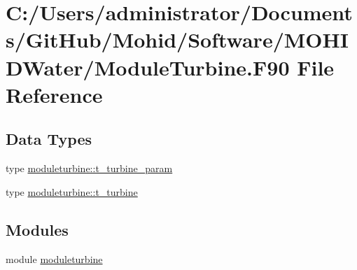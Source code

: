 \hypertarget{_module_turbine_8_f90}{}\section{C\+:/\+Users/administrator/\+Documents/\+Git\+Hub/\+Mohid/\+Software/\+M\+O\+H\+I\+D\+Water/\+Module\+Turbine.F90 File Reference}
\label{_module_turbine_8_f90}
\subsection*{Data Types}
\begin{DoxyCompactItemize}
\item 
type \mbox{\hyperlink{structmoduleturbine_1_1t__turbine__param}{moduleturbine\+::t\+\_\+turbine\+\_\+param}}
\item 
type \mbox{\hyperlink{structmoduleturbine_1_1t__turbine}{moduleturbine\+::t\+\_\+turbine}}
\end{DoxyCompactItemize}
\subsection*{Modules}
\begin{DoxyCompactItemize}
\item 
module \mbox{\hyperlink{namespacemoduleturbine}{moduleturbine}}
\end{DoxyCompactItemize}
